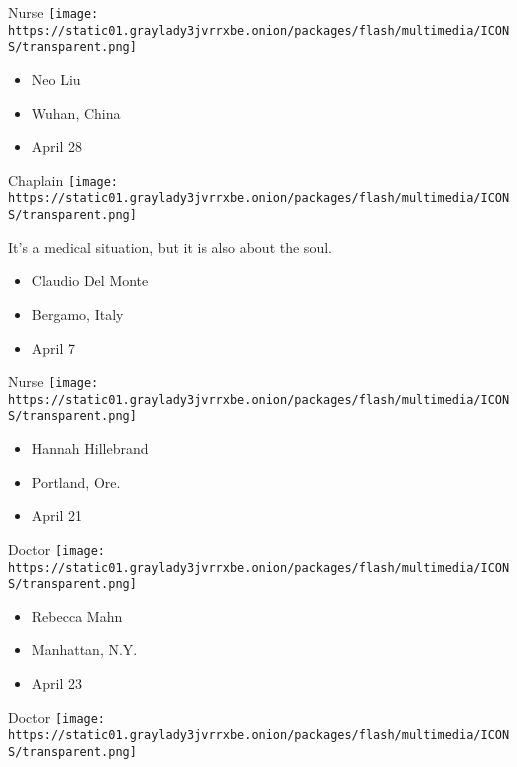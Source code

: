\protect\hyperlink{item-neo-liu}{}

Nurse
\texttt{[image: https://static01.graylady3jvrrxbe.onion/packages/flash/multimedia/ICONS/transparent.png]}

\begin{itemize}
\tightlist
\item
  Neo Liu
\item
  Wuhan, China
\item
  April 28
\end{itemize}

\protect\hyperlink{item-claudio-del-monte}{}

Chaplain
\texttt{[image: https://static01.graylady3jvrrxbe.onion/packages/flash/multimedia/ICONS/transparent.png]}

It's a medical situation, but it is also about the soul.

\begin{itemize}
\tightlist
\item
  Claudio Del Monte
\item
  Bergamo, Italy
\item
  April 7
\end{itemize}

\protect\hyperlink{item-hannah-hillebrand}{}

Nurse
\texttt{[image: https://static01.graylady3jvrrxbe.onion/packages/flash/multimedia/ICONS/transparent.png]}

\begin{itemize}
\tightlist
\item
  Hannah Hillebrand
\item
  Portland, Ore.
\item
  April 21
\end{itemize}

\protect\hyperlink{item-rebecca-mahn}{}

Doctor
\texttt{[image: https://static01.graylady3jvrrxbe.onion/packages/flash/multimedia/ICONS/transparent.png]}

\begin{itemize}
\tightlist
\item
  Rebecca Mahn
\item
  Manhattan, N.Y.
\item
  April 23
\end{itemize}

\protect\hyperlink{item-stephen-berns}{}

Doctor
\texttt{[image: https://static01.graylady3jvrrxbe.onion/packages/flash/multimedia/ICONS/transparent.png]}

